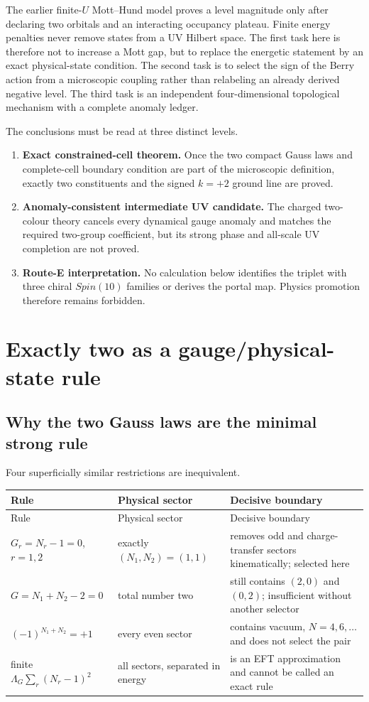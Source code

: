 \documentclass[11pt]{article}
\theoremstyle{definition}
\theoremstyle{remark}
\begin{document}
The earlier finite-\(U\) Mott--Hund model proves a level magnitude only after
declaring two orbitals and an interacting occupancy plateau.  Finite energy
penalties never remove states from a UV Hilbert space.  The first task here is
therefore not to increase a Mott gap, but to replace the energetic statement
by an exact physical-state condition.  The second task is to select the sign
of the Berry action from a microscopic coupling rather than relabeling an
already derived negative level.  The third task is an independent
four-dimensional topological mechanism with a complete anomaly ledger.

The conclusions must be read at three distinct levels.
\begin{enumerate}[label=(L\arabic*)]
\item \textbf{Exact constrained-cell theorem.}  Once the two compact Gauss
  laws and complete-cell boundary condition are part of the microscopic
  definition, exactly two constituents and the signed \(k=+2\) ground line
  are proved.
\item \textbf{Anomaly-consistent intermediate UV candidate.}  The charged
  two-colour theory cancels every dynamical gauge anomaly and matches the
  required two-group coefficient, but its strong phase and all-scale UV
  completion are not proved.
\item \textbf{Route-E interpretation.}  No calculation below identifies the
  triplet with three chiral \(Spin(10)\) families or derives the portal map.
  Physics promotion therefore remains forbidden.
\end{enumerate}

\section{Exactly two as a gauge/physical-state rule}

\subsection{Why the two Gauss laws are the minimal strong rule}

Four superficially similar restrictions are inequivalent.
\begin{longtable}{@{}L{0.24\textwidth}L{0.21\textwidth}L{0.46\textwidth}@{}}
\toprule
Rule & Physical sector & Decisive boundary\\
\midrule
\endfirsthead
\toprule
Rule & Physical sector & Decisive boundary\\
\midrule
\endhead
\(G_r=N_r-1=0\), \(r=1,2\) & exactly \((N_1,N_2)=(1,1)\) & removes odd and
charge-transfer sectors kinematically; selected here\\
\(G=N_1+N_2-2=0\) & total number two & still contains \((2,0)\) and
\((0,2)\); insufficient without another selector\\
\((-1)^{N_1+N_2}=+1\) & every even sector & contains vacuum, \(N=4,6,\ldots\)
and does not select the pair\\
finite \(\Lambda_G\sum_r(N_r-1)^2\) & all sectors, separated in energy & is
an EFT approximation and cannot be called an exact rule\\
\bottomrule
\end{longtable}
\end{document}
